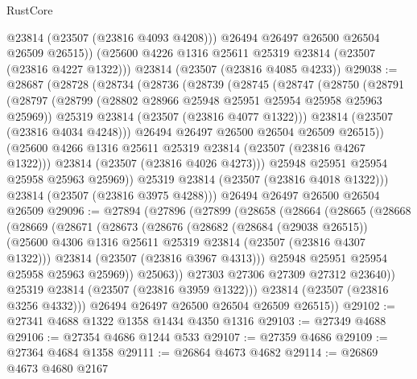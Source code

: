 \begin{lexlean}{RustCore}
\begin{coremodule}
          @23814
          (@23507 (@23816 @4093 @4208)))
        @26494
        @26497
        @26500
        @26504
        @26509
        @26515))
    (@25600 @4226 @1316 @25611 @25319 @23814 (@23507 (@23816 @4227 @1322)))
    @23814
    (@23507 (@23816 @4085 @4233))
@29038 := @28687
    (@28728
      (@28734
        (@28736
          (@28739
            (@28745
              (@28747
                (@28750
                  (@28791
                    (@28797
                      (@28799 (@28802 @28966 @25948 @25951 @25954 @25958 @25963 @25969))
                      @25319
                      @23814
                      (@23507 (@23816 @4077 @1322)))
                    @23814
                    (@23507 (@23816 @4034 @4248)))
                  @26494
                  @26497
                  @26500
                  @26504
                  @26509
                  @26515))
              (@25600 @4266 @1316 @25611 @25319 @23814 (@23507 (@23816 @4267 @1322)))
              @23814
              (@23507 (@23816 @4026 @4273)))
            @25948
            @25951
            @25954
            @25958
            @25963
            @25969))
        @25319
        @23814
        (@23507 (@23816 @4018 @1322)))
      @23814
      (@23507 (@23816 @3975 @4288)))
    @26494
    @26497
    @26500
    @26504
    @26509
@29096 := @27894
    (@27896
      (@27899
        (@28658
          (@28664
            (@28665
              (@28668
                (@28669
                  (@28671
                    (@28673
                      (@28676
                        (@28682
                          (@28684 (@29038 @26515))
                          (@25600 @4306 @1316 @25611 @25319 @23814 (@23507 (@23816 @4307 @1322)))
                          @23814
                          (@23507 (@23816 @3967 @4313)))
                        @25948
                        @25951
                        @25954
                        @25958
                        @25963
                        @25969))
                    @25063))
                @27303
                @27306
                @27309
                @27312
                @23640))
            @25319
            @23814
            (@23507 (@23816 @3959 @1322)))
          @23814
          (@23507 (@23816 @3256 @4332)))
        @26494
        @26497
        @26500
        @26504
        @26509
        @26515))
@29102 := @27341 @4688 @1322 @1358 @1434 @4350 @1316
@29103 := @27349 @4688
@29106 := @27354 @4686 @1244 @533
@29107 := @27359 @4686
@29109 := @27364 @4684 @1358
@29111 := @26864 @4673 @4682
@29114 := @26869 @4673 @4680 @2167

\end{coremodule}
\end{lexlean}
